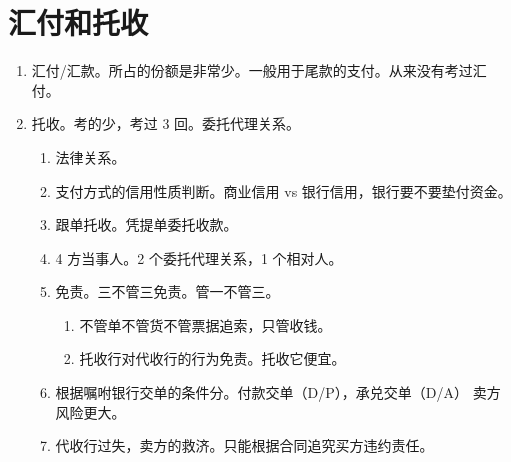 \section{汇付和托收}
\begin{enumerate}
  \item 汇付/汇款。所占的份额是非常少。一般用于尾款的支付。从来没有考过汇付。
  \item 托收。考的少，考过 3 回。委托代理关系。
        \begin{enumerate}
          \item 法律关系。
          \item 支付方式的信用性质判断。商业信用 vs 银行信用，银行要不要垫付资金。
          \item 跟单托收。凭提单委托收款。
          \item 4 方当事人。2 个委托代理关系，1 个相对人。
          \item 免责。三不管三免责。管一不管三。
                \begin{enumerate}
                  \item 不管单不管货不管票据追索，只管收钱。
                  \item 托收行对代收行的行为免责。托收它便宜。
                \end{enumerate}
          \item 根据嘱咐银行交单的条件分。付款交单（D/P），承兑交单（D/A） \yjt 卖方风险更大。
          \item 代收行过失，卖方的救济。只能根据合同追究买方违约责任。
        \end{enumerate}
\end{enumerate}
